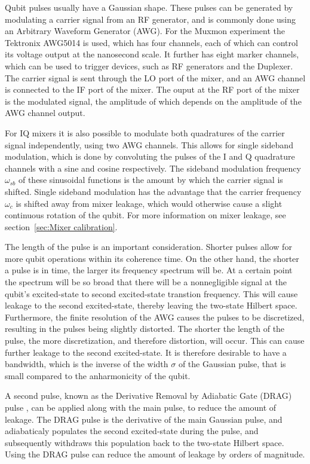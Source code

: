         Qubit pulses usually have a Gaussian shape. These pulses can be generated by modulating a carrier signal from an RF generator, and is commonly done using an Arbitrary Waveform Generator (AWG). For the Muxmon experiment the Tektronix AWG5014 is used, which has four channels, each of which can control its voltage output at the nanosecond scale. It further has eight marker channels, which can be used to trigger devices, such as RF generators and the Duplexer. The carrier signal is sent through the LO port of the mixer, and an AWG channel is connected to the IF port of the mixer. The ouput at the RF port of the mixer is the modulated signal, the amplitude of which depends on the amplitude of the AWG channel output.

        For IQ mixers it is also possible to modulate both quadratures of the carrier signal independently, using two AWG channels. This allows for single sideband modulation, which is done by convoluting the pulses of the I and Q quadrature channels with a sine and cosine respectively. The sideband modulation frequency $\omega_{sb}$ of these sinusoidal functions is the amount by which the carrier signal is shifted. Single sideband modulation has the advantage that the carrier frequency $\omega_c$ is shifted away from mixer leakage, which would otherwise cause a slight continuous rotation of the qubit. For more information on mixer leakage, see section~\ref{sec:Mixer calibration}.

        The length of the pulse is an important consideration. Shorter pulses allow for more qubit operations within its coherence time. On the other hand, the shorter a pulse is in time, the larger its frequency spectrum will be. At a certain point the spectrum will be so broad that there will be a nonnegligible signal at the qubit's excited-state to second excited-state transtion frequency. This will cause leakage to the second excited-state, thereby leaving the two-state Hilbert space.
        Furthermore, the finite resolution of the AWG causes the pulses to be discretized, resulting in the pulses being slightly distorted. The shorter the length of the pulse, the more discretization, and therefore distortion, will occur. This can cause further leakage to the second excited-state. It is therefore desirable to have a bandwidth, which is the inverse of the width $\sigma$ of the Gaussian pulse, that is small compared to the anharmonicity of the qubit.

        A second pulse, known as the Derivative Removal by Adiabatic Gate (DRAG) pulse \cite{motzoi2009simple}, can be applied along with the main pulse, to reduce the amount of leakage. The DRAG pulse is the derivative of the main Gaussian pulse, and adiabaticaly populates the second excited-state during the pulse, and subsequently withdraws this population back to the two-state Hilbert space. Using the DRAG pulse can reduce the amount of leakage by orders of magnitude.

